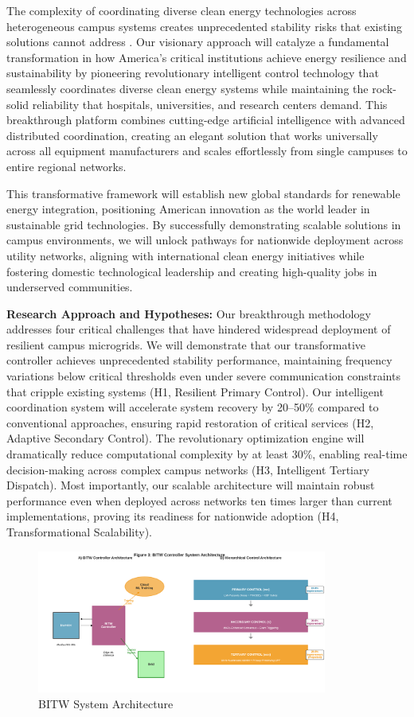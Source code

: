 \documentclass[12pt]{article}
\begin{document}
The complexity of coordinating diverse clean energy technologies across heterogeneous campus systems creates unprecedented stability risks that existing solutions cannot address \cite{katiraei2008,molina2020}. Our visionary approach will catalyze a fundamental transformation in how America's critical institutions achieve energy resilience and sustainability by pioneering revolutionary intelligent control technology that seamlessly coordinates diverse clean energy systems while maintaining the rock-solid reliability that hospitals, universities, and research centers demand. This breakthrough platform combines cutting-edge artificial intelligence with advanced distributed coordination, creating an elegant solution that works universally across all equipment manufacturers and scales effortlessly from single campuses to entire regional networks.

This transformative framework will establish new global standards for renewable energy integration, positioning American innovation as the world leader in sustainable grid technologies. By successfully demonstrating scalable solutions in campus environments, we will unlock pathways for nationwide deployment across utility networks, aligning with international clean energy initiatives while fostering domestic technological leadership and creating high-quality jobs in underserved communities.

\textbf{Research Approach and Hypotheses:} Our breakthrough methodology addresses four critical challenges that have hindered widespread deployment of resilient campus microgrids. We will demonstrate that our transformative controller achieves unprecedented stability performance, maintaining frequency variations below critical thresholds even under severe communication constraints that cripple existing systems (H1, Resilient Primary Control). Our intelligent coordination system will accelerate system recovery by 20–50\% compared to conventional approaches, ensuring rapid restoration of critical services (H2, Adaptive Secondary Control). The revolutionary optimization engine will dramatically reduce computational complexity by at least 30\%, enabling real-time decision-making across complex campus networks (H3, Intelligent Tertiary Dispatch). Most importantly, our scalable architecture will maintain robust performance even when deployed across networks ten times larger than current implementations, proving its readiness for nationwide adoption (H4, Transformational Scalability).

\begin{figure}[H]
\centering
\includegraphics[width=0.85\textwidth]{figure3_system_architecture.pdf}
\caption{BITW System Architecture}
\end{figure}
\end{document}
